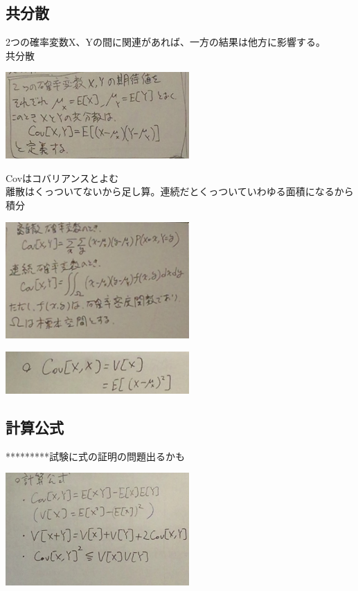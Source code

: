 \documentclass{jsarticle}
\begin{document}
	\subsection{共分散}
	2つの確率変数X、Yの間に関連があれば、一方の結果は他方に影響する。\\
	{\Large{共分散}}\\
	\begin{center}
		\includegraphics[width=7cm]{11_30_C.JPG}
	\end{center}
	Covはコバリアンスとよむ\\
	離散はくっついてないから足し算。連続だとくっついていわゆる面積になるから積分
	\begin{center}
		\includegraphics[width=7cm]{11_30_C2.JPG}
	\end{center}
	\begin{center}
		\includegraphics[width=7cm]{11_30_C3.JPG}
	\end{center}
	\subsection{計算公式}
	{\large{*********試験に式の証明の問題出るかも}}
	\begin{center}
		\includegraphics[width=7cm]{11_30_C4.JPG}
	\end{center}
\end{document}
